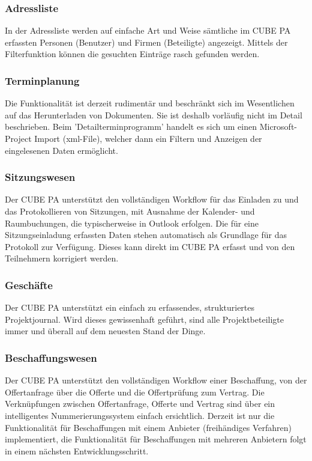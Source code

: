 \pagebreak
\subsubsection{Adressliste} %

In der Adressliste werden auf einfache Art und Weise sämtliche im CUBE PA erfassten Personen (Benutzer) und Firmen (Beteiligte) angezeigt. Mittels der Filterfunktion können die gesuchten Einträge rasch gefunden werden.

\subsubsection{Terminplanung} %

Die Funktionalität ist derzeit rudimentär und beschränkt sich im Wesentlichen auf das Herunterladen von Dokumenten. Sie ist deshalb vorläufig nicht im Detail beschrieben. Beim 'Detailterminprogramm' handelt es sich um einen Microsoft-Project Import (xml-File), welcher dann ein Filtern und Anzeigen der eingelesenen Daten ermöglicht.

\subsubsection{Sitzungswesen} %

Der CUBE PA unterstützt den vollständigen Workflow für das Einladen zu und das Protokollieren von Sitzungen, mit Ausnahme der Kalender- und Raumbuchungen, die typischerweise in Outlook erfolgen. Die für eine Sitzungseinladung erfassten Daten stehen automatisch als Grundlage für das Protokoll zur Verfügung. Dieses kann direkt im CUBE PA erfasst und von den Teilnehmern korrigiert werden.

\subsubsection{Geschäfte} %

Der CUBE PA unterstützt ein einfach zu erfassendes, strukturiertes Projektjournal. Wird dieses gewissenhaft geführt, sind alle Projektbeteiligte immer und überall auf dem neuesten Stand der Dinge.

\subsubsection{Beschaffungswesen} %

Der CUBE PA unterstützt den vollständigen Workflow einer Beschaffung, von der Offertanfrage über die Offerte und die Offertprüfung zum Vertrag. Die Verknüpfungen zwischen Offertanfrage, Offerte und Vertrag sind über ein intelligentes Nummerierungssystem einfach ersichtlich. Derzeit ist nur die Funktionalität für Beschaffungen mit einem Anbieter (freihändiges Verfahren) implementiert, die Funktionalität für Beschaffungen mit mehreren Anbietern folgt in einem nächsten Entwicklungsschritt.

